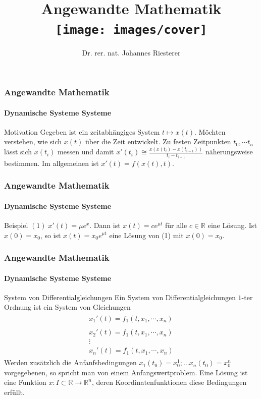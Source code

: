 \documentclass{beamer}
\begin{document}
\title[Angewandte Mathematik] %
{Angewandte Mathematik
\\
\texttt{[image: images/cover]}
}
\subtitle{}
\author[Dr. Johannes Riesterer] %
{Dr.  rer. nat. Johannes Riesterer}

\date[KPT 2004] %
{}

\subject{Angewandte Mathematik}



\frame{\titlepage}



\begin{frame}
    \frametitle{Angewandte Mathematik}
\framesubtitle{Dynamische Systeme Systeme}
\begin{block}{Motivation}
Gegeben ist ein zeitabhängiges System $t \mapsto x(t)$. Möchten verstehen, wie sich $x(t)$ über die Zeit entwickelt. Zu festen Zeitpunkten $t_0, \cdots t_n $ lässt sich $x(t_i)$ messen und damit $x'(t_i) \cong \frac{x(x(t_i) - x(t_{i-1}))}{t_i - t_{i-1}}$ näherungsweise bestimmen. Im allgemeinen ist $x'(t) = f(x(t), t)$. 
\end{block}
 \end{frame}

\begin{frame}
    \frametitle{Angewandte Mathematik}
\framesubtitle{Dynamische Systeme Systeme}
\begin{block}{Beispiel}
$(1) \;x'(t) = \mu e^{x}$.  Dann ist $x(t)= c e^{\mu t}$ für alle $c \in \mathbb{R}$ eine Lösung. Ist $x(0) = x_0$, so ist   $x(t)= x_0 e^{\mu t}$ eine Lösung von (1) mit $x(0) = x_0$. 
\end{block}
 \end{frame}

\begin{frame}
    \frametitle{Angewandte Mathematik}
\framesubtitle{Dynamische Systeme Systeme}
\begin{block}{System von Differentialgleichungen}
Ein System von Differentialgleichungen $1$-ter Ordnung ist ein System von Gleichungen
\begin{align*}
\begin{matrix} x_1'(t) = f_1(t, x_1, \cdots, x_n ) \\  \\ x_2'(t) = f_1(t, x_1, \cdots, x_n ) \\  \vdots \\  x_n'(t) = f_1(t, x_1, \cdots, x_n )\end{matrix}
\end{align*}
Werden zusätzlich die Anfanfsbedingungen $x_1(t_0)= x_0^1; \dots x_n(t_0) = x_0^n$ vorgegebenen, so spricht man von einem Anfangswertproblem.
Eine Lösung ist eine Funktion $x : I \subset \mathbb{R} \to \mathbb{R}^n$, deren Koordinatenfunktionen diese Bedingungen erfüllt.
\end{block}
 \end{frame}
\end{document}
